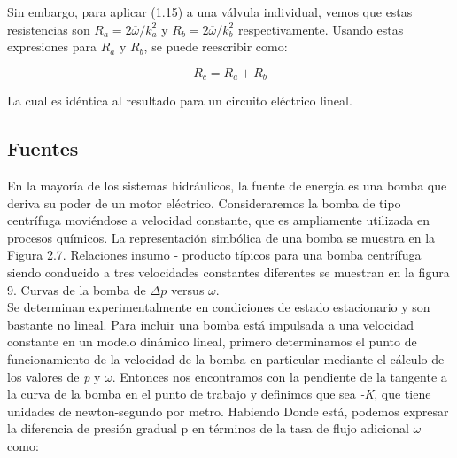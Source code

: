 \documentclass[a4paper,12pt,twoside]{proyectotanquesecci}
\begin{document}
Sin embargo, para aplicar (1.15) a una válvula individual, vemos que estas resistencias son $R_{a}=2\overline{\omega}/k^{2}_{a}$ y $R_{b}=2\overline{\omega}/k^{2}_{b}$ respectivamente. Usando estas expresiones para $R_{a}$ y $R_{b}$, se puede reescribir como:

\begin{equation}
R_{c}=R_{a}+R_{b}
\end{equation}

La cual es idéntica al resultado para un circuito eléctrico lineal.

\subsection{Fuentes}

En la mayoría de los sistemas hidráulicos, la fuente de energía es una bomba que deriva su poder de un motor eléctrico. Consideraremos la bomba de tipo centrífuga moviéndose a velocidad constante, que es ampliamente utilizada en procesos químicos. La representación simbólica de una bomba se muestra en la Figura 2.7. Relaciones insumo - producto típicos para una bomba centrífuga siendo conducido a tres velocidades constantes diferentes se muestran en la figura 9. Curvas de la bomba de $\Delta p$ versus $\omega$.\\



Se determinan experimentalmente en condiciones de estado estacionario y son bastante no lineal. Para incluir una bomba está impulsada a una velocidad constante en un modelo dinámico lineal, primero determinamos el punto de funcionamiento de la velocidad de la bomba en particular mediante el cálculo de los valores de \textit{p} y $\omega$. Entonces nos encontramos con la pendiente de la tangente a la curva de la bomba en el punto de trabajo y definimos que sea \textit{-K}, que tiene unidades de newton-segundo por metro. Habiendo Donde está, podemos expresar la diferencia de presión gradual p en términos de la tasa de flujo adicional $\omega$ como:
\end{document}
